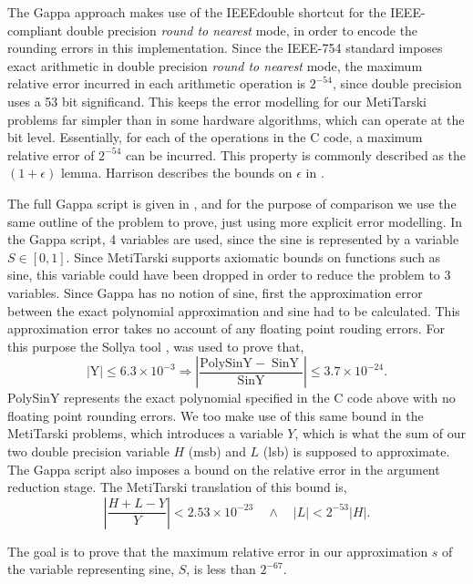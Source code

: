 \documentclass{fac}
\begin{document}
The Gappa approach makes use of the IEEEdouble shortcut for the IEEE-compliant double precision \textit{round to nearest} mode, in order to encode the rounding errors in this implementation. Since the IEEE-754 standard imposes exact arithmetic in double precision \textit{round to nearest} mode, the maximum relative error incurred in each arithmetic operation is $2^{-54}$, since double precision uses a 53 bit significand. This keeps the error modelling for our MetiTarski problems far simpler than in some hardware algorithms, which can operate at the bit level. Essentially, for each of the operations in the C code, a maximum relative error of $2^{-54}$ can be incurred. This property is commonly described as the $(1+\epsilon)$ lemma. Harrison describes the bounds on $\epsilon$ in \cite{harrison2006floating}.

The full Gappa script is given in \cite{5483294}, and for the purpose of comparison we use the same outline of the problem to prove, just using more explicit error modelling. In the Gappa script, 4 variables are used, since the sine is represented by a variable $S\in[0,1]$. Since MetiTarski supports axiomatic bounds on functions such as sine, this variable could have been dropped in order to reduce the problem to 3 variables. Since Gappa has no notion of sine, first the approximation error between the exact polynomial approximation and sine had to be calculated. This approximation error takes no account of any floating point rouding errors. For this purpose the Sollya tool \cite{ChevillardJoldesLauter2010}, was used to prove that,
\begin{equation}
|\mathrm{Y}| \leq 6.3 \times 10^{-3} \Rightarrow\left|\frac{\mathrm{PolySinY}-\operatorname{SinY}}{\operatorname{SinY}}\right| \leq 3.7 \times 10^{-24}.
\end{equation}
PolySinY represents the exact polynomial specified in the C code above with no floating point rounding errors. We too make use of this same bound in the MetiTarski problems, which introduces a variable $Y$, which is what the sum of our two double precision variable $H$ (msb) and $L$ (lsb) is supposed to approximate. The Gappa script also imposes a bound on the relative error in the argument reduction stage. The MetiTarski translation of this bound is,
\begin{equation*}
    \left|\frac{H+L-Y}{Y}\right| < 2.53\times 10^{-23} \quad \land \quad |L|<2^{-53}|H|.
\end{equation*}

The goal is to prove that the maximum relative error in our approximation $s$ of the variable representing sine, $S$, is less than $2^{-67}$.
\end{document}
